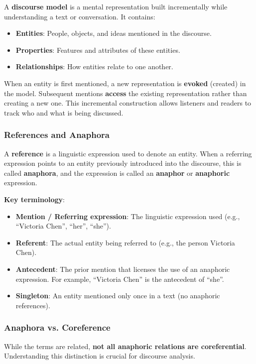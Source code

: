 \documentclass[11pt,a4paper]{article}
\begin{document}
A \textbf{discourse model} is a mental representation built incrementally while understanding a text or conversation. It contains:
\begin{itemize}
    \item \textbf{Entities}: People, objects, and ideas mentioned in the discourse.
    \item \textbf{Properties}: Features and attributes of these entities.
    \item \textbf{Relationships}: How entities relate to one another.
\end{itemize}

When an entity is first mentioned, a new representation is \textbf{evoked} (created) in the model. Subsequent mentions \textbf{access} the existing representation rather than creating a new one. This incremental construction allows listeners and readers to track who and what is being discussed.

\subsubsection{References and Anaphora}

A \textbf{reference} is a linguistic expression used to denote an entity. When a referring expression points to an entity previously introduced into the discourse, this is called \textbf{anaphora}, and the expression is called an \textbf{anaphor} or \textbf{anaphoric} expression.

\textbf{Key terminology}:
\begin{itemize}
    \item \textbf{Mention / Referring expression}: The linguistic expression used (e.g., ``Victoria Chen'', ``her'', ``she'').
    \item \textbf{Referent}: The actual entity being referred to (e.g., the person Victoria Chen).
    \item \textbf{Antecedent}: The prior mention that licenses the use of an anaphoric expression. For example, ``Victoria Chen'' is the antecedent of ``she''.
    \item \textbf{Singleton}: An entity mentioned only once in a text (no anaphoric references).
\end{itemize}

\subsubsection{Anaphora vs. Coreference}

While the terms are related, \textbf{not all anaphoric relations are coreferential}. Understanding this distinction is crucial for discourse analysis.
\end{document}

